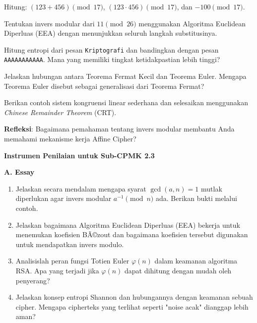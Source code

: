 \documentclass[main.tex]{subfiles}
\begin{document}

\begin{latihan}
  \item Hitung: $(123 + 456) \pmod{17}$, $(123 \cdot 456) \pmod{17}$, dan $-100 \pmod{17}$.
  \item Tentukan invers modular dari $11 \pmod{26}$ menggunakan Algoritma Euclidean Diperluas (EEA) dengan menunjukkan seluruh langkah substitusinya.
  \item Hitung entropi dari pesan \texttt{Kriptografi} dan bandingkan dengan pesan \texttt{AAAAAAAAAAA}. Mana yang memiliki tingkat ketidakpastian lebih tinggi?
  \item Jelaskan hubungan antara Teorema Fermat Kecil dan Teorema Euler. Mengapa Teorema Euler disebut sebagai generalisasi dari Teorema Fermat?
  \item Berikan contoh sistem kongruensi linear sederhana dan selesaikan menggunakan \textit{Chinese Remainder Theorem} (CRT).
  \item \textbf{Refleksi}: Bagaimana pemahaman tentang invers modular membantu Anda memahami mekanisme kerja Affine Cipher?
\end{latihan}


\begin{asesmen}
\textbf{Instrumen Penilaian untuk Sub-CPMK 2.3}

\textbf{A. Essay}

\begin{enumerate}
  \item Jelaskan secara mendalam mengapa syarat $\gcd(a, n) = 1$ mutlak diperlukan agar invers modular $a^{-1} \pmod{n}$ ada. Berikan bukti melalui contoh.
  \item Jelaskan bagaimana Algoritma Euclidean Diperluas (EEA) bekerja untuk menemukan koefisien BÃ©zout dan bagaimana koefisien tersebut digunakan untuk mendapatkan invers modulo.
  \item Analisislah peran fungsi Totien Euler $\varphi(n)$ dalam keamanan algoritma RSA. Apa yang terjadi jika $\varphi(n)$ dapat dihitung dengan mudah oleh penyerang?
  \item Jelaskan konsep entropi Shannon dan hubungannya dengan keamanan sebuah cipher. Mengapa cipherteks yang terlihat seperti "noise acak" dianggap lebih aman?
\end{enumerate}
\end{asesmen}
\end{document}
